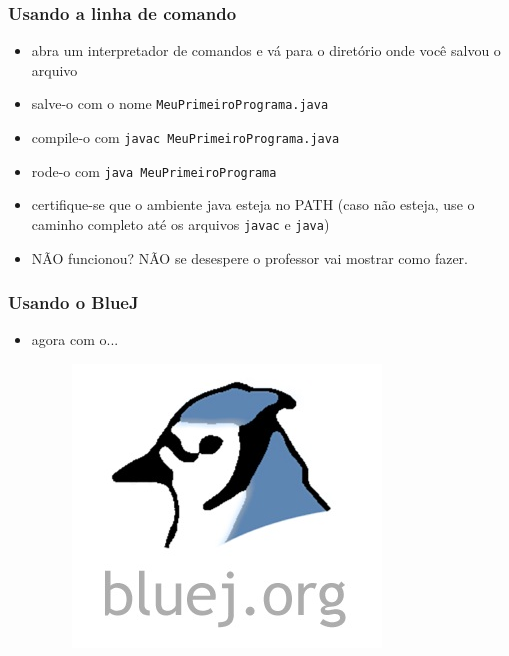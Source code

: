 \documentclass[aspectratio=169]{beamer}
\begin{document}
\begin{frame}\frametitle{Usando a linha de comando}
\begin{itemize}
	\item abra um interpretador de comandos e vá para o diretório onde você salvou o arquivo
	\item salve-o com o nome \texttt{MeuPrimeiroPrograma.java}
	\item compile-o com \texttt{javac MeuPrimeiroPrograma.java}
	\item rode-o com \texttt{java MeuPrimeiroPrograma}
	\item certifique-se que o ambiente java esteja no PATH (caso não esteja, use o caminho completo até os arquivos \texttt{javac} e \texttt{java})
	\item NÃO funcionou? NÃO se desespere o professor vai mostrar como fazer.
\end{itemize}
\end{frame}

\begin{frame}\frametitle{Usando o BlueJ}
\begin{itemize}
	\item agora com o...
	\begin{figure}[h]
		\centering
		\includegraphics[height=0.5\paperheight]{pucrs-ep-fprog-unidade_01-introducao-laminas-bluej_logo.jpg}
	\end{figure}
\end{itemize}
\end{frame}
\end{document}
